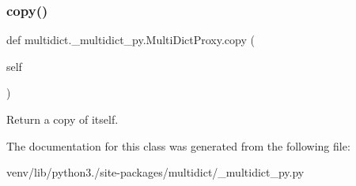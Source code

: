 \subsubsection{\texorpdfstring{copy()}{copy()}}
{\footnotesize\ttfamily def multidict.\+\_\+multidict\+\_\+py.\+Multi\+Dict\+Proxy.\+copy (\begin{DoxyParamCaption}\item[{}]{self }\end{DoxyParamCaption})}

\begin{DoxyVerb}Return a copy of itself.\end{DoxyVerb}
 

The documentation for this class was generated from the following file\+:\begin{DoxyCompactItemize}
\item 
venv/lib/python3./site-\/packages/multidict/\+\_\+multidict\+\_\+py.\+py\end{DoxyCompactItemize}
